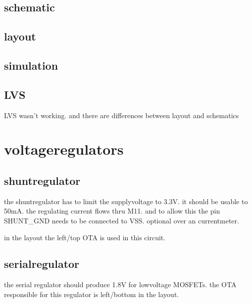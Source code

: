 \documentclass[letterpaper,10pt,english]{sphinxmanual}
\begin{document}
\section{schematic}
\label{\detokenize{reference:schematic}}


\section{layout}
\label{\detokenize{reference:layout}}


\section{simulation}
\label{\detokenize{reference:simulation}}
\sphinxAtStartPar
{}


\section{LVS}
\label{\detokenize{reference:lvs}}
\sphinxAtStartPar
LVS wasn’t working. and there are differences between layout and schematics

\sphinxstepscope


\chapter{voltage\sphinxhyphen{}regulators}
\label{\detokenize{regulators:voltage-regulators}}\label{\detokenize{regulators::doc}}

\section{shunt\sphinxhyphen{}regulator}
\label{\detokenize{regulators:shunt-regulator}}
\sphinxAtStartPar
the shunt\sphinxhyphen{}regulator has to limit the supply\sphinxhyphen{}voltage to 3.3V. it should be usable to 50mA. the regulating current flows thru M11. and to allow this the pin SHUNT\_GND needs to be connected to VSS. optional over an current\sphinxhyphen{}meter.

\sphinxAtStartPar
in the layout the left/top OTA is used in this circuit.


\section{serial\sphinxhyphen{}regulator}
\label{\detokenize{regulators:serial-regulator}}
\sphinxAtStartPar
the serial regulator should produce 1.8V for low\sphinxhyphen{}voltage MOSFETs. the OTA responsible for this regulator is left/bottom in the layout.
\end{document}
